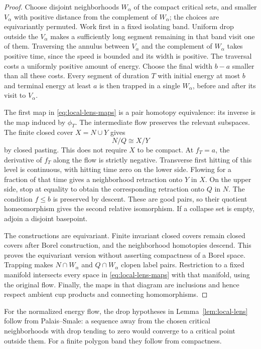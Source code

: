\begin{proof}
Choose disjoint neighborhoods \(W_\alpha\) of the compact critical
sets, and smaller \(V_\alpha\) with positive distance from the
complement of \(W_\alpha\); the choices are equivariantly
permuted.  Work first in a fixed isolating band.  Uniform drop
outside the \(V_\alpha\) makes a sufficiently long segment
remaining in that band visit one of them.  Traversing the annulus
between \(V_\alpha\) and the complement of \(W_\alpha\) takes
positive time, since the speed is bounded and its width is
positive.  The traversal costs a uniformly positive amount of
energy.  Choose the final width \(b-a\) smaller than all these
costs.  Every segment of duration \(T\) with initial energy at
most \(b\) and terminal energy at least \(a\) is then trapped
in a single \(W_\alpha\), before and after its visit to
\(V_\alpha\).

The first map in \eqref{eq:local-lens-maps} is a pair homotopy
equivalence: its inverse is the map induced by \(\phi_T\).
The intermediate flow preserves the relevant subspaces.
The finite closed cover \(X=N\cup Y\) gives
\[
 N/Q\cong X/Y
\]
by closed pasting.  This does not require \(X\) to be compact.
At \(f_T=a\), the derivative of \(f_T\) along the flow is
strictly negative.  Transverse first hitting of this level is
continuous, with hitting time zero on the lower side.  Flowing
for a fraction of that time gives a neighborhood retraction
onto \(Y\) in \(X\).  On the upper side, stop at equality to
obtain the corresponding retraction onto \(Q\) in \(N\).
The condition \(f\le b\) is preserved by descent.  These are
good pairs, so their quotient homeomorphism gives the second
relative isomorphism.  If a collapse set is empty, adjoin a
disjoint basepoint.

The constructions are equivariant.  Finite invariant closed
covers remain closed covers after Borel construction, and the
neighborhood homotopies descend.  This proves the equivariant
version without asserting compactness of a Borel space.
Trapping makes \(N\cap W_\alpha\) and \(Q\cap W_\alpha\) clopen
label pairs.  Restriction to a fixed manifold intersects every
space in \eqref{eq:local-lens-maps} with that manifold, using
the original flow.  Finally, the maps in that diagram are
inclusions and hence respect ambient cup products and
connecting homomorphisms.
\end{proof}

For the normalized energy flow, the drop hypotheses in
Lemma~\ref{lem:local-lens} follow from Palais--Smale: a sequence
away from the chosen critical neighborhoods with drop tending
to zero would converge to a critical point outside them.
For a finite polygon band they follow from compactness.

